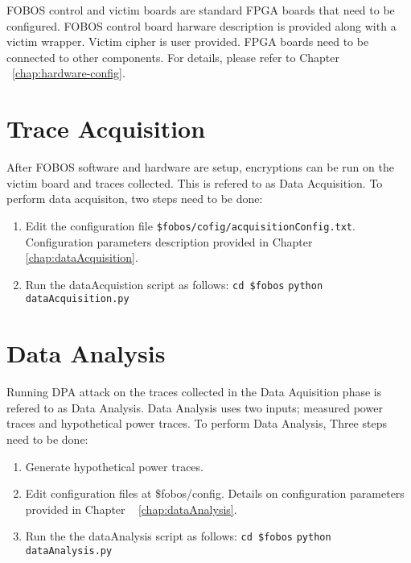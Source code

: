 FOBOS control and victim boards are standard FPGA boards that need to be configured. FOBOS control board harware description is provided along with a victim wrapper. Victim cipher is user provided.
FPGA boards need to be connected to other components. For details, please refer to Chapter ~\ref{chap:hardware-config}.

\section{Trace Acquisition}
After FOBOS software and hardware are setup, encryptions can be run on the victim board and traces collected.
This is refered to as Data Acquisition.
To perform data acquisiton, two steps need to be done:
\begin{enumerate}
\item Edit the configuration file \texttt{\$fobos/cofig/acquisitionConfig.txt}. Configuration parameters description provided in Chapter ~ \ref{chap:dataAcquisition}.
\item Run the dataAcquistion script as follows: \newline
\texttt{cd \$fobos} \newline
\texttt{python dataAcquisition.py}
\end{enumerate}
 
\section{Data Analysis}
Running DPA attack on the traces collected in the Data Aquisition phase is refered to as Data Analysis.
Data Analysis uses two inputs; measured power traces and hypothetical power traces.
To perform Data Analysis, Three steps need to be done:
\begin{enumerate}
\item Generate hypothetical power traces.
\item Edit configuration files at \$fobos/config. Details on configuration parameters provided in Chapter ~ \ref{chap:dataAnalysis}.
\item Run the the dataAnalysis script as follows: \newline
\texttt{cd \$fobos} \newline
\texttt{python dataAnalysis.py}
\end{enumerate}